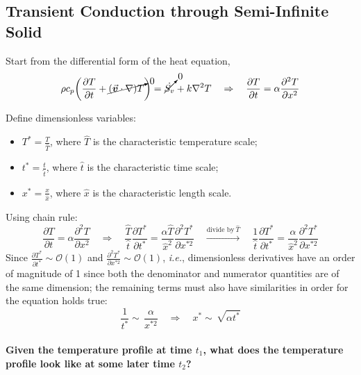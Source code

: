 \documentclass[12pt, a4paper]{article}
\numberwithin{equation}{subsection}
\begin{document}
\subsection{Transient Conduction through Semi-Infinite Solid}
Start from the differential form of the heat equation,
\[
    \rho c_{p} \bigg( \frac{\partial T}{\partial t} +\cancelto{0}{(\vec{\bm{v}} \cdot \nabla) T} \bigg) = \cancelto{0}{\dot{S_{v}}}  +k \nabla^{2} T \quad \Rightarrow \quad \frac{\partial T}{\partial t} = \alpha \frac{\partial^2 T}{\partial x^2}
\]

Define dimensionless variables:
\begin{itemize}
    \item $T^{*} = \frac{T}{\hat{T}}$, where $\hat{T}$ is the characteristic temperature scale;
    \item $t^{*} = \frac{t}{\hat{t}}$, where $\hat{t}$ is the characteristic time scale;
    \item $x^{*} = \frac{x}{\hat{x}}$, where $\hat{x}$ is the characteristic length scale.
\end{itemize}
Using chain rule:
\[
    \frac{\partial T}{\partial t} = \alpha \frac{\partial^2 T}{\partial x^2}
    \quad \Rightarrow \quad
    \frac{\hat{T}}{\hat{t}} \frac{\partial T^{*}}{\partial t^{*}} = \frac{\alpha \hat{T}}{\hat{x}^{2}} \frac{\partial^{2}T^{*}}{\partial x^{*2}} \quad \xrightarrow[]{\text{divide by} \ \hat{T}} \quad \frac{1}{\hat{t}} \frac{\partial T^{*}}{\partial t^{*}} = \frac{\alpha}{\hat{x}^{2}} \frac{\partial^{2}T^{*}}{\partial x^{*2}}
\]
Since $\displaystyle \frac{\partial T^{*}}{\partial t^{*}} \sim \mathcal{O}(1)$ and $\displaystyle \frac{\partial^2 T^{*}}{\partial x^{*2}} \sim \mathcal{O}(1)$, \textit{i.e.}, dimensionless derivatives have an order of magnitude of 1 since both the denominator and numerator quantities are of the same dimension; the remaining terms must also have similarities in order for the equation holds true:
\[
    \frac{1}{t^{*}} \sim \, \frac{\alpha}{x^{*2}}
    \quad \Rightarrow \quad x^{*} \sim \, \sqrt{\alpha t^{*}}
\]

\paragraph{Given the temperature profile at time $t_1$, what does the temperature profile look like at some later time $t_2$?}
\end{document}
